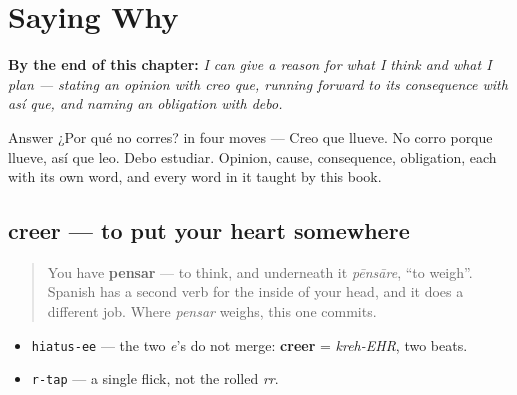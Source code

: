
\chapter{Saying Why}
\label{ch:spanish-giving-reasons}

\begin{chapteropening}
\textbf{By the end of this chapter:} \emph{I can give a reason for what I think and what I plan — stating an opinion with creo que, running forward to its consequence with así que, and naming an obligation with debo.}

Answer ¿Por qué no corres? in four moves — Creo que llueve. No corro porque llueve, así que leo. Debo estudiar. Opinion, cause, consequence, obligation, each with its own word, and every word in it taught by this book.
\end{chapteropening}

\section[creer]{creer — to put your heart somewhere}

\label{lesson:ES-C41-creer}



\begin{quote}
You have \textbf{pensar} — to think, and underneath it \emph{pēnsāre}, \textquotedblleft{}to weigh\textquotedblright{}. Spanish has a second verb for the inside of your head, and it does a different job. Where \emph{pensar} weighs, this one commits.
\end{quote}

\begin{sounds}
\begin{itemize}
\raggedright
  \item \texttt{hiatus-ee} — the two \emph{e}'s do not merge: \textbf{creer} = \emph{kreh-EHR}, two beats.
  \item \texttt{r-tap} — a single flick, not the rolled \emph{rr}.
\end{itemize}
\end{sounds}


